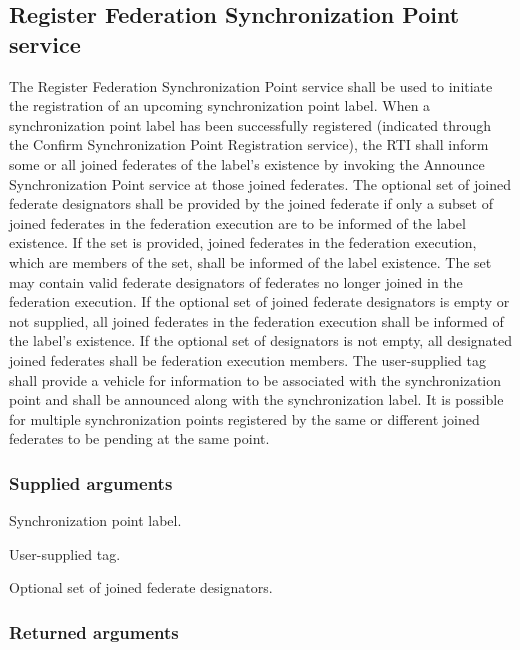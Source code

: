 \subsection{Register Federation Synchronization Point service}

The Register Federation Synchronization Point service shall be used to initiate the registration of an upcoming synchronization point label. When a synchronization point label has been successfully registered (indicated through the Confirm Synchronization Point Registration \rtiinitiated{} service), the RTI shall inform some or all joined federates of the label's existence by invoking the Announce Synchronization Point \rtiinitiated{} service at those joined federates. The optional set of joined federate designators shall be provided by the joined federate if only a subset of joined federates in the federation execution are to be informed of the label existence. If the set is provided, joined federates in the federation execution, which are members of the set, shall be informed of the label existence. The set may contain valid federate designators of federates no longer joined in the federation execution. If the optional set of joined federate designators is empty or not supplied, all joined federates in the federation execution shall be informed of the label's existence. If the optional set of designators is not empty, all designated joined federates shall be federation execution members. The user-supplied tag shall provide a vehicle for information to be associated with the synchronization point and shall be announced along with the synchronization label. It is possible for multiple synchronization points registered by the same or different joined federates to be pending at the same point.

\subsubsection{Supplied arguments}

\begin{stdalphalist}
    \item Synchronization point label.
    \item User-supplied tag.
    \item Optional set of joined federate designators.
\end{stdalphalist}

\subsubsection{Returned arguments}


